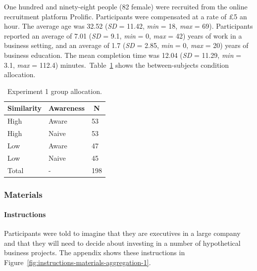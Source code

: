 \documentclass[a4paper, nobind, dvipsnames]{templates/ociamthesis}
\theoremstyle{definition}
\theoremstyle{definition}
\theoremstyle{definition}
\theoremstyle{definition}
\theoremstyle{remark}
\begin{document}
One hundred and ninety-eight people (82 female) were recruited from the online recruitment platform Prolific. Participants were compensated at a rate of £5 an hour. The average age was 32.52 (\emph{SD} = 11.42, \emph{min} = 18, \emph{max} = 69). Participants reported an average of 7.01 (\emph{SD} = 9.1, \emph{min} = 0, \emph{max} = 42) years of work in a business setting, and an average of 1.7 (\emph{SD} = 2.85, \emph{min} = 0, \emph{max} = 20) years of business education. The mean completion time was 12.04 (\emph{SD} = 11.29, \emph{min} = 3.1, \emph{max} = 112.4) minutes.~Table~\ref{tab:condition-allocation-aggregation-1}
shows the between-subjects condition allocation.

\begin{table}[tbp]

\begin{center}
\begin{threeparttable}

\caption{\label{tab:condition-allocation-aggregation-1}Experiment 1 group allocation.}

\begin{tabular}{lll}
\toprule
Similarity & \multicolumn{1}{c}{Awareness} & \multicolumn{1}{c}{N}\\
\midrule
High & Aware & 53\\
High & Naive & 53\\
Low & Aware & 47\\
Low & Naive & 45\\
Total & - & 198\\
\bottomrule
\end{tabular}

\end{threeparttable}
\end{center}

\end{table}

\subsubsection{Materials}

\hypertarget{instructions-materials-aggregation-1}{%
\paragraph{Instructions}\label{instructions-materials-aggregation-1}}

Participants were told to imagine that they are executives in a large company
and that they will need to decide about investing in a number of hypothetical
business projects. The appendix shows these instructions in
Figure~\ref{fig:instructions-materials-aggregation-1}.
\end{document}
